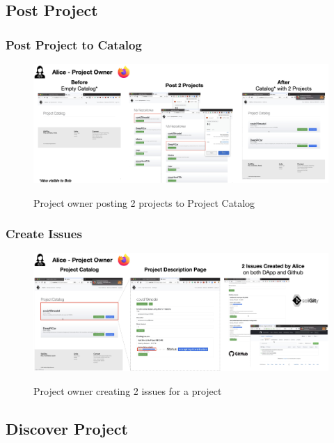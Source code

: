 \documentclass[12pt]{article}
\renewcommand{\_}{\kern-1.5pt\textunderscore\kern-1.5pt}
\begin{document}
\subsection{Post Project}
\subsubsection{Post Project to Catalog}
\begin{figure}[H]
	\centering
	\includegraphics[width=16.5cm]{graphs/50. post_1.png}\\
	\caption{Project owner posting 2 projects to Project Catalog}
	\label{fig:post1}
\end{figure}

\subsubsection{Create Issues}

\begin{figure}[H]
	\centering
	\includegraphics[width=16.5cm]{graphs/51. post_2.png}\\
	\caption{Project owner creating 2 issues for a project}
	\label{fig:post2}
\end{figure}



\subsection{Discover Project}
\end{document}
